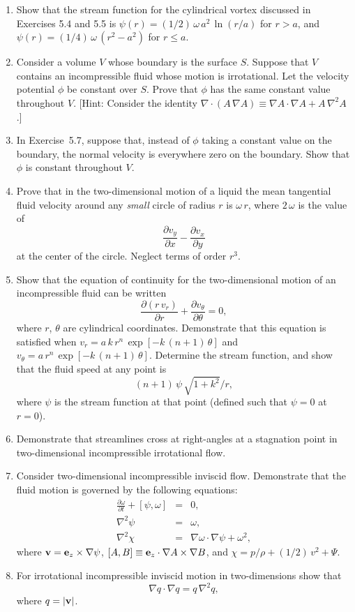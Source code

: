{\begin{enumerate}
\item Show that the stream function for the cylindrical vortex discussed in Exercises 5.4 and 5.5 is
$\psi(r)=(1/2)\,\omega\,a^2\,\ln(r/a)$ for $r>a$, and $\psi(r)=(1/4)\,\omega\,(r^2-a^2)$ for $r\leq a$. 

\item Consider a volume $V$ whose boundary is the  surface $S$. Suppose that $V$ contains an
incompressible fluid whose motion is irrotational. Let the velocity potential $\phi$ be constant over
$S$. Prove that $\phi$ has the same constant value throughout $V$. [Hint: Consider the identity
$\nabla\cdot(A\,\nabla A)\equiv \nabla A\cdot \nabla A +A\,\nabla^2 A$.]

\item In Exercise~5.7, suppose that, instead of $\phi$ taking a constant value on the boundary, the
normal velocity is everywhere zero on the boundary. Show that $\phi$ is constant throughout $V$. 

\item Prove that in the two-dimensional motion of a liquid the mean tangential
fluid velocity around any {\em small}\/ circle of radius $r$ is $\omega\,r$, where $2\,\omega$
is the value of
$$
\frac{\partial v_y}{\partial x}- \frac{\partial v_x}{\partial y}
$$
at the center of the circle. Neglect terms of order $r^3$. 

\item Show that the equation of continuity for the two-dimensional motion of an
incompressible fluid can be written
$$
\frac{\partial (r\,v_r)}{\partial r} + \frac{\partial v_\theta}{\partial\theta}=0,
$$
where $r$, $\theta$ are cylindrical coordinates. Demonstrate that this
equation is satisfied when $v_r=a\,k\,r^n\,\exp[-k\,(n+1)\,\theta]$ and
$v_\theta=a\,r^n\,\exp[-k\,(n+1)\,\theta]$. Determine the stream function, and
show that the fluid speed at any point is
$$
(n+1)\,\psi\,\sqrt{1+k^2}/r,
$$
where $\psi$ is the stream function at that point (defined such that $\psi=0$ at $r=0$). 

\item Demonstrate that streamlines cross at right-angles at a stagnation point in two-dimensional incompressible
irrotational flow.

\item Consider two-dimensional incompressible inviscid flow. Demonstrate that the fluid  motion
is governed by the following equations:
\begin{eqnarray}
\frac{\partial\omega}{\partial t} +[\psi,\omega] &=& 0,\nonumber\\[0.5ex]
\nabla^2\psi &=&\omega,\nonumber\\[0.5ex]
\nabla^2\chi &=&\nabla\omega\cdot\nabla\psi + \omega^2,\nonumber
\end{eqnarray}
where ${\bf v} = {\bf e}_z\times \nabla\psi$,  $[A,B] \equiv {\bf e}_z\cdot\nabla A \times\nabla B$, and
$\chi = p/\rho+(1/2)\,v^2+\Psi$. 

\item For irrotational incompressible inviscid motion in two-dimensions show that
$$
\nabla q\cdot\nabla q = q\,\nabla^2 q,
$$
where $q=|{\bf v}|$. 

\end{enumerate}}
